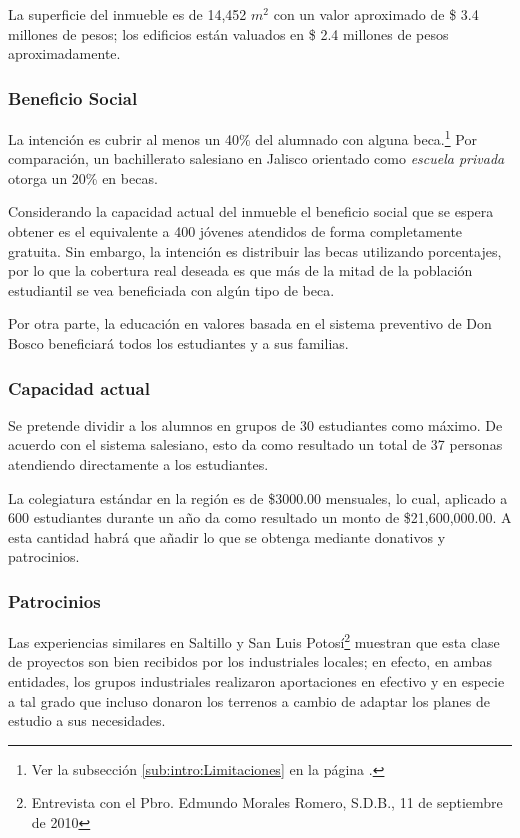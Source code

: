 La superficie del inmueble es de 14,452 $m^2$ con un valor aproximado de \$ 3.4 millones de pesos; los edificios están valuados en \$ 2.4 millones de pesos aproximadamente.


\subsubsection{Beneficio Social}
\label{sub:sub:Beneficio:Social}

La intención es cubrir al menos un 40\% del alumnado con alguna beca.\footnote{Ver la subsección \ref{sub:intro:Limitaciones} en la página \pageref{sub:intro:Limitaciones}.} Por comparación, un bachillerato salesiano en Jalisco orientado como \emph{escuela privada} otorga un 20\% en becas.

Considerando la capacidad actual del inmueble el beneficio social que se espera obtener es el equivalente a 400 jóvenes atendidos de forma completamente gratuita. Sin embargo, la intención es distribuir las becas utilizando porcentajes, por lo que la cobertura real deseada es que más de la mitad de la población estudiantil se vea beneficiada con algún tipo de beca.

Por otra parte, la educación en valores basada en el sistema preventivo de Don Bosco beneficiará todos los estudiantes y a sus familias.

\subsubsection{Capacidad actual}

Se pretende dividir a los alumnos en grupos de 30 estudiantes como máximo. De acuerdo con el sistema salesiano, esto da como resultado un total de 37 personas atendiendo directamente a los estudiantes.

La colegiatura estándar en la región es de \$3000.00 mensuales, lo cual, aplicado a 600 estudiantes durante un año da como resultado un monto de \$21,600,000.00. A esta cantidad habrá que añadir lo que se obtenga mediante donativos y patrocinios.

\subsubsection{Patrocinios}
\label{sub:Patrocinios}

Las experiencias similares en Saltillo y San Luis Potosí\footnote{Entrevista con el Pbro. Edmundo Morales Romero, S.D.B., 11 de septiembre de 2010} muestran que esta clase de proyectos son bien recibidos por los industriales locales; en efecto, en ambas entidades, los grupos industriales realizaron aportaciones en efectivo y en especie a tal grado que incluso donaron los terrenos a cambio de adaptar los planes de estudio a sus necesidades.

